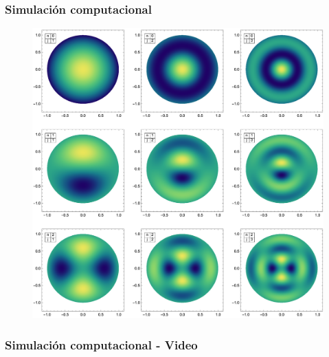 \documentclass[12pt]{beamer}
\newcommand{\includemovie}[3]{%
\includemedia[
  width=0.8\linewidth, %
  height=0.6\linewidth, %
  activate=onclick,     %
  addresource=membrana_03.mp4,%
  flashvars={
     source=membrana_03.mp4   %
    &autoPlay=true      %
  }%
]{}{StrobeMediaPlayback.swf}%
}%
\begin{document}
\begin{frame}
\frametitle{Simulación computacional}
\begin{figure}[h!]
    \centering
    \includegraphics[scale=0.32]{Imagenes/Modos_Vibracion_Membrana_Circular_01.eps}
\end{figure}
\end{frame}
\begin{frame}
\frametitle{Simulación computacional - Video}
 \centering
\end{frame}
\end{document}
